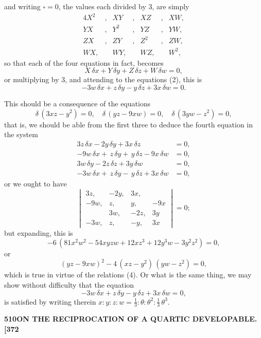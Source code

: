 \documentclass[11pt,a4paper]{article}
\begin{document}
\noindent
and writing $\square = 0$, the values each divided by 3, are simply
\begin{alignat*}{4}
X^{2} &,& XY &,& XZ &,& XW,\\
YX &,& Y^{2} &,& YZ &,& YW,\\
ZX &,& ZY &,& Z^{2} &,& ZW,\\
WX,&& WY,&& WZ,&& W^{2},
\end{alignat*}
so that each of the four equations in fact, becomes
\[
X\,\delta x + Y\,\delta y + Z\,\delta z + W\,\delta w = 0,
\]
or multiplying by 3, and attending to the equations (2), this is
\[
-3w\,\delta x + z\,\delta y - y\,\delta z + 3x\,\delta w = 0.
\]

This should be a consequence of the equations
\[
\delta\,(3xz - y^{2}) = 0,\quad \delta\,(yz - 9xw) = 0,\quad \delta\,(3yw - z^{2}) = 0,
\]
that is, we should be able from the first three to deduce the fourth equation in the system
\begin{align*}
3z\,\delta x - 2y\,\delta y + 3x\,\delta z \phantom{- 9x\,\delta w} &= 0,\\
-9w\,\delta x + \,z\,\delta y + \,y\,\delta z - 9x\,\delta w &= 0,\\
3w\,\delta y - 2z\,\delta z + 3y\,\delta w \phantom{- 9x\,\delta w} &= 0,\\
-3w\,\delta x + \,z\,\delta y - \,y\,\delta z + 3x\,\delta w &= 0,
\end{align*}
or we ought to have
\[
\begin{vmatrix}
3z, & -2y, & 3x, \\
-9w, & z, & y, & -9x \\
& 3w, & -2z, & 3y \\
-3w, & z, & -y, & 3x
\end{vmatrix}
= 0;
\]
but expanding, this is
\[
-6\,(81x^{2}w^{2} - 54xyzw + 12xz^{3} + 12y^{3}w - 3y^{2}z^{2}) = 0,
\]
or
\[
(yz - 9xw)^{2} - 4\,(xz - y^{2})\,(yw - z^{2}) = 0,
\]
which is true in virtue of the relations (4). Or what is the same thing, we may show without difficulty that the equation
\[
-3w\,\delta x + z\,\delta y - y\,\delta z + 3x\,\delta w = 0,
\]
is satisfied by writing therein $x : y : z : w = \tfrac{1}{3} : \theta : \theta^{2} : \tfrac{1}{3}\,\theta^{3}$.

\newpage
\noindent\textbf{510\hspace{1em}ON THE RECIPROCATION OF A QUARTIC DEVELOPABLE.\hfill[372}

\vspace{12pt}
\end{document}
